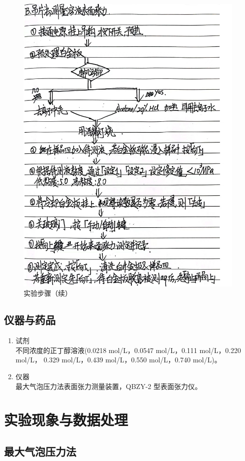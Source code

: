 \documentclass[cn,hazy,pku,12pt,normal,math=newtx,cite=super]{elegantnote}
\begin{document}
\begin{figure}[htbp]
    \centering
    \includegraphics[width = .70\textwidth]{image/yxbg_3.jpg}
    \caption{实验步骤（续）}\label{4}
\end{figure}

\newpage

\subsection{仪器与药品}

\begin{enumerate} %
    \item 试剂 \\不同浓度的正丁醇溶液(0.0218 mol/L，0.0547 mol/L，0.111 mol/L，0.220 mol/L，
    0.329 mol/L，0.439 mol/L，0.550 mol/L，0.740 mol/L)。
    \item 仪器 \\ 最大气泡压力法表面张力测量装置，QBZY-2 型表面张力仪。
\end{enumerate}

\section{实验现象与数据处理}

\subsection{最大气泡压力法}
\end{document}
